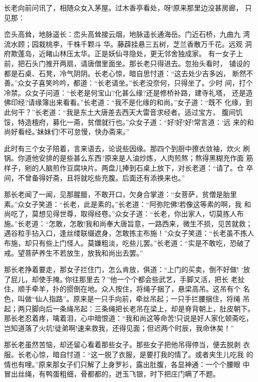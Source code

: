 长老向前问讯了，相随众女入茅屋。过木香亭看处，呀!原来那里边没甚房廊，
只见那：

峦头高耸，地脉遥长：峦头高耸接云烟，地脉遥长通海岳。门近石桥，九曲九
湾流水顾；园栽桃李，千株千颗斗华。藤薜挂悬三五树，芝兰香散万千花。远观
洞府欺蓬岛，近睹山林压太华。正是妖仙寻隐处，更无邻舍独成家。
有一女子上前，把石头门推开两扇，请唐僧里面坐。那长老只得进去。忽抬头看时，
铺设的都是石桌、石凳，冷气阴阴。长老心惊，暗自思忖道：“这去处少吉多凶，
断然不善。”众女子喜笑吟吟，都道：“长老请坐。”长老没奈何，只得坐了。少时
间，打个冷禁。众女子问道：“长老是何宝山?化甚么缘?还是修桥补路，建寺礼塔，
还是造佛印经?请缘簿出来看看。”长老道：“我不是化缘的和尚。”女子道：“既不
化缘，到此何干？”长老道：“我是东土大唐差去西天大雷音求经者。适过宝方，
腹间饥馁，特造檀府，募化一斋，贫僧就行也。”众女子道：“好!好!好!常言道：‘远
来的和尚好看经。’妹妹们!不可怠慢，快办斋来。”

此时有三个女子陪着，言来语去，论说些因缘。那四个到厨中撩衣敛袖，炊火
刷锅。你道他安排的是些甚么东西?原来是人油炒炼，人肉煎熬；熬得黑糊充作面
筋样子，剜的人脑煎作豆腐块片。两盘儿捧到石桌上放下，对长老道：“请了。仓
卒间，不曾备得好斋，且将就吃些充腹。后面还有添换来也。”

那长老闻了一闻，见那腥膻，不敢开口，欠身合掌道：“女菩萨，贫僧是胎里
素。”众女子笑道：“长老，此是素的。”长老道：“阿弥陀佛!若像这等素的啊，我
和尚吃了，莫想见得世尊，取得经卷。”众女子道：“长老，你出家人，切莫拣人布
施。”长老道：“怎敢，怎敢!我和尚奉大唐旨意，一路西来，微生不损，见苦就救；
遇谷粒手拈入口，逢丝缕联缀遮身，怎敢拣主布施！”众女子笑道：“长老虽不拣人
布施，却只有些上门怪人。莫嫌粗淡，吃些儿罢。”长老道：“实是不敢吃，恐破了
戒。望菩萨养生不若放生，放我和尚出去罢。”

那长老挣着要走，那女子拦住门，怎么肯放，俱道：“上门的买卖，倒不好做!
‘放了屁儿，却使手掩。’你往那里去？”他一个个都会些武艺，手脚又活，把长
老扯住，顺手牵羊，扑的掼倒在地。众人按住，将绳子捆了，悬梁高吊。这吊有个
名色，叫做“仙人指路”。原来是一只手向前，牵丝吊起；一只手拦腰捆住，将绳
吊起；两只脚向后一条绳吊起：三条绳把长老吊在梁上，却是脊背朝上，肚皮朝下。
那长老忍着疼，噙着泪，心中暗恨道：“我和尚这等命苦!只说是好人家化顿斋吃，
岂知道落了火坑!徒弟啊!速来救我，还得见面；但迟两个时辰，我命休矣！”

那长老虽然苦恼，却还留心看着那些女子。那些女子把他吊得停当，便去脱剥
衣服。长老心惊，暗自忖道：“这一脱了衣服，是要打我的情了。或者夹生儿吃我
的情也有哩。”原来那女子们只解了上身罗衫，露出肚腹，各显神通：一个个腰眼
中冒出丝绳，有鸭蛋粗细，骨都都的，迸玉飞银，时下把庄门瞒了不题。

